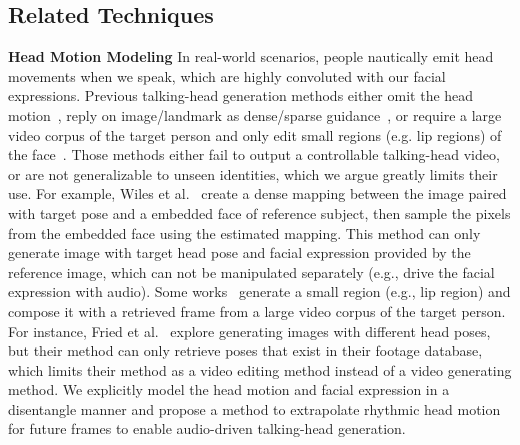\documentclass[runningheads]{llncs}
\begin{document}
\subsection{Related Techniques }
\label{subsec:related_tec}
\noindent \textbf{Head Motion Modeling} \quad
In real-world scenarios, people nautically emit head movements when we speak, which are highly convoluted with our facial expressions. Previous talking-head generation methods either omit the head motion~\cite{pumarola2019ganimation,chen2019hierarchical,chung2017you,ijcai2019-129,zhou2019talking,vougioukas2019realistic}, reply on image/landmark as dense/sparse guidance~\cite{wiles2018x2face,zakharov2019few,wang2018fewshotvid2vid}, or require a large video corpus of the target person and only edit small regions (e.g. lip regions) of the face~\cite{suwajanakorn2017synthesizing,fried2019text}. Those methods either fail to output a controllable talking-head video, or are not generalizable to unseen identities, which we argue greatly limits their use. For example, Wiles et al.~\cite{wiles2018x2face} create a dense mapping between the image paired with target pose and a embedded face of reference subject, then sample the pixels from the embedded face using the estimated mapping. This method can only generate image with target head pose and facial expression provided by the reference image, which can not be manipulated separately (e.g., drive the facial expression with audio). Some works~\cite{suwajanakorn2017synthesizing,fried2019text} generate a small region (e.g., lip region) and compose it with a retrieved frame from a large video corpus of the target person. For instance, Fried et al.~\cite{fried2019text} explore generating images with different head poses, but their method can only retrieve poses that exist in their footage database, which limits their method as a video editing method instead of a video generating method. We explicitly model the head motion and facial expression in a disentangle manner and propose a method to extrapolate rhythmic head motion for future frames to enable audio-driven talking-head generation.  
\end{document}
